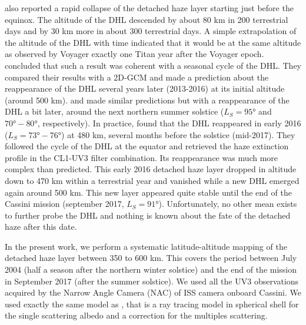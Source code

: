 \cite{West2011} also reported a rapid collapse of the detached haze layer starting just before the equinox. The altitude of
the DHL descended by about 80 km in 200 terrestrial days and by 30 km more in about 300 terrestrial days. A simple
extrapolation of the altitude of the DHL with time indicated that it would be at the same altitude as observed by Voyager
exactly one Titan year after the Voyager epoch. \cite{West2011} concluded that such a result was coherent with a seasonal
cycle of the DHL.  They compared their results with a 2D-GCM \citep{Rannou2002} and made a prediction about the reappearance of the
DHL several years later (2013-2016) at its initial altitude (around 500 km). \cite{Lebonnois2012} and \cite{Larson2015} made
similar predictions but with a reappearance of the DHL a bit later, around the next northern summer solstice ($L_S=\ang{95}$
and $\ang{70}-\ang{80}$, respectively). In practice, \cite{West2018} found that the DHL reappeared in early 2016
($L_S=\ang{73}-\ang{76}$) at 480 km, several months before the solstice (mid-2017). They followed the cycle of the DHL at the equator
and retrieved the haze extinction profile in the CL1-UV3 filter combination.
Its reappearance was much more complex than predicted. This early 2016 detached haze layer
dropped in altitude down to 470 km within a terrestrial year and vanished while a new DHL emerged again around 500 km. This
new layer appeared quite stable until the end of the Cassini mission (september 2017, $L_S=\ang{91}$). Unfortunately, no other
mean exists to further probe the DHL and nothing is known about the fate of the detached haze after this date.

\medskip

In the present work, we perform a systematic latitude-altitude mapping of the detached haze layer between 350 to 600 km.
This covers the period between July 2004 (half a season after the northern winter solstice) and the end of
the mission in September 2017 (after the summer solstice).
We used all the UV3 observations acquired by the Narrow Angle Camera (NAC) of ISS camera onboard Cassini.
We used exactly the same model as \cite{West2018}, that is a ray tracing model in spherical shell for the single scattering albedo
and a correction for the multiples scattering.

